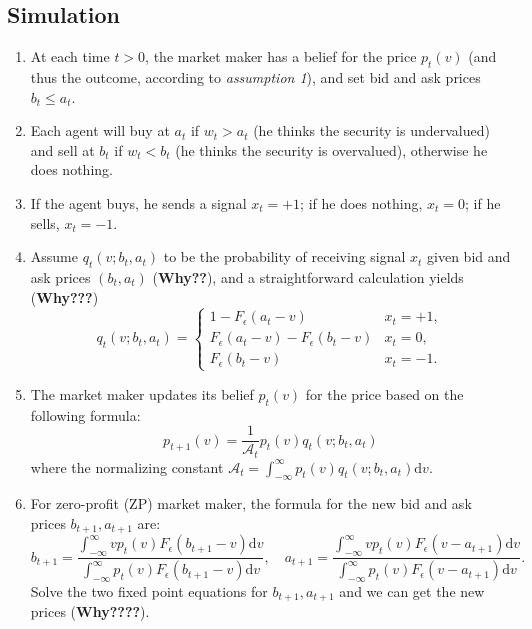 \documentclass{article}
\begin{document}
        \subsection*{Simulation}
        \begin{enumerate}
            \item At each time $t>0$, the market maker has a belief for the price $p_t(v)$ (and thus the outcome, according to \textit{assumption 1}), and set bid and ask prices $b_t\leq a_t$.
            \item Each agent will buy at $a_t$ if $w_t>a_t$ (he thinks the security is undervalued) and sell at $b_t$ if $w_t<b_t$ (he thinks the security is overvalued), otherwise he does nothing. 
            \item If the agent buys, he sends a signal $x_t=+1$; if he does nothing, $x_t=0$; if he sells, $x_t=-1$.
            \item Assume $q_t(v;b_t,a_t)$ to be the probability of receiving signal $x_t$ given bid and ask prices $(b_t,a_t)$ (\textbf{Why??}), and a straightforward calculation yields (\textbf{Why???}) 
            \[ q_t(v;b_t,a_t)=\begin{cases}
                1-F_\epsilon(a_t-v) & x_t=+1,\\
                F_\epsilon(a_t-v)-F_\epsilon(b_t-v) & x_t=0,\\
                F_\epsilon(b_t-v) & x_t=-1.
            \end{cases} \]
            \item The market maker updates its belief $p_t(v)$ for the price based on the following formula:
            \[ p_{t+1}(v)=\dfrac{1}{\mathcal{A}_t}p_t(v)q_t(v;b_t,a_t) \] where the normalizing constant $\mathcal{A}_t=\int_{-\infty}^{\infty}p_t(v)q_t(v;b_t,a_t)\mathrm{d}v$.
            \item For zero-profit (ZP) market maker, the formula for the new bid and ask prices $b_{t+1},a_{t+1}$ are:
            \[ b_{t+1}=\frac{\int_{-\infty}^{\infty}vp_t(v)F_\epsilon(b_{t+1}-v)\mathrm{d}v}{\int_{-\infty}^{\infty}p_t(v)F_\epsilon(b_{t+1}-v)\mathrm{d}v},\quad a_{t+1}=\frac{\int_{-\infty}^{\infty}vp_t(v)F_\epsilon(v-a_{t+1})\mathrm{d}v}{\int_{-\infty}^{\infty}p_t(v)F_\epsilon(v-a_{t+1})\mathrm{d}v}. \]
            Solve the two fixed point equations for $b_{t+1},a_{t+1}$ and we can get the new prices (\textbf{Why????}).
        \end{enumerate}
\end{document}
